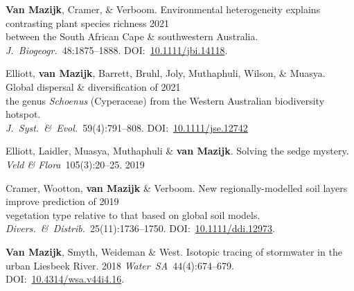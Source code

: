 \begin{hangparas}{2em}{1}

\textbf{Van Mazijk}, Cramer, \& Verboom.
Environmental heterogeneity explains contrasting plant species richness
                                                                  \hfill 2021 \\
  \hspace{2em} between the South African Cape \& southwestern Australia.      \\
  \hspace{2em} \textit{J.~Biogeogr.}~48:1875--1888.
DOI:~\href{https://doi.org/10.1111/jbi.14118}{10.1111/jbi.14118}.

Elliott, \textbf{van Mazijk}, Barrett, Bruhl,
Joly, Muthaphuli, Wilson, \& Muasya.
Global dispersal \& diversification of                            \hfill 2021 \\
  \hspace{2em} the genus \textit{Schoenus} (Cyperaceae)
    from the Western Australian biodiversity hotspot.                         \\
  \hspace{2em} \textit{J.~Syst.~\&~Evol.}~59(4):791--808.
DOI:~\href{https://doi.org/10.1111/jse.1274}{10.1111/jse.12742}

Elliott, Laidler, Muasya, Muthaphuli \& \textbf{van Mazijk}.
Solving the sedge mystery.
\textit{Veld \& Flora}~105(3):20--25. \hfill 2019

Cramer, Wootton, \textbf{van Mazijk} \& Verboom.
New regionally-modelled soil layers improve prediction of         \hfill 2019 \\
  \hspace{2em} vegetation type relative to that based on global soil models.  \\
  \hspace{2em} \textit{Divers.~\&~Distrib.}~25(11):1736--1750.
DOI:~\href{https://doi.org/10.1111/ddi.12973}{10.1111/ddi.12973}.

\textbf{Van Mazijk}, Smyth, Weideman \& West.
Isotopic tracing of stormwater in the urban Liesbeek River.       \hfill 2018
\textit{Water~SA}~44(4):674--679.
DOI:~\href{https://doi.org/10.4314/wsa.v44i4.16}{10.4314/wsa.v44i4.16}.

\end{hangparas}
